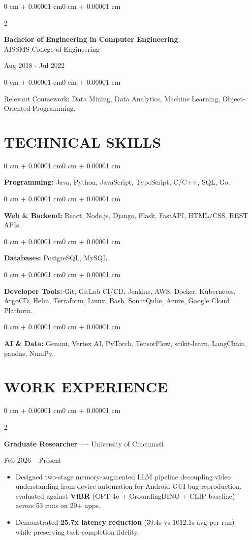 \documentclass[10pt, letterpaper]{article}
\newenvironment{highlights}{
    \begin{itemize}[
        topsep=0.10 cm,
        parsep=0.06 cm,
        partopsep=0pt,
        itemsep=0.06 cm,
        leftmargin=12pt
    ]
}{
    \end{itemize}
}
\newenvironment{onecolentry}{
    \begin{adjustwidth}{0 cm + 0.00001 cm}{0 cm + 0.00001 cm}
}{
    \end{adjustwidth}
}
\newenvironment{twocolentry}[2][]{
    \onecolentry
    \def\secondColumn{#2}
    \setcolumnwidth{\fill, 4.5 cm}
    \begin{paracol}{2}
}{
    \switchcolumn \raggedleft \secondColumn
    \end{paracol}
    \endonecolentry
}
\begin{document}
\begin{twocolentry}{
    Aug 2018 - Jul 2022
}
    \textbf{Bachelor of Engineering in Computer Engineering} \\
    AISSMS College of Engineering
\end{twocolentry}
\begin{onecolentry}
Relevant Coursework: Data Mining, Data Analytics, Machine Learning, Object-Oriented Programming.
\end{onecolentry}
\section{TECHNICAL SKILLS}
\begin{onecolentry}
\textbf{Programming:} Java, Python, JavaScript, TypeScript, C/C++, SQL, Go.
\end{onecolentry}
\vspace{0.06 cm}
\begin{onecolentry}
\textbf{Web \& Backend:} React, Node.js, Django, Flask, FastAPI, HTML/CSS, REST APIs.
\end{onecolentry}
\vspace{0.06 cm}
\begin{onecolentry}
\textbf{Databases:} PostgreSQL, MySQL.
\end{onecolentry}
\vspace{0.06 cm}
\begin{onecolentry}
\textbf{Developer Tools:} Git, GitLab CI/CD, Jenkins, AWS, Docker, Kubernetes, ArgoCD, Helm, Terraform, Linux, Bash, SonarQube, Azure, Google Cloud Platform.
\end{onecolentry}
\vspace{0.06 cm}
\begin{onecolentry}
\textbf{AI \& Data:} Gemini, Vertex AI, PyTorch, TensorFlow, scikit-learn, LangChain, pandas, NumPy.
\end{onecolentry}

\section{WORK EXPERIENCE}
\begin{twocolentry}{Feb 2026 -- Present}
\textbf{Graduate Researcher} ---- University of Cincinnati
\end{twocolentry}
\begin{highlights}
  \item Designed two-stage memory-augmented LLM pipeline decoupling video understanding from device automation for Android GUI bug reproduction, evaluated against \textbf{ViBR} (GPT-4o + GroundingDINO + CLIP baseline) across 53 runs on 20+ apps.
  \item Demonstrated \textbf{25.7x latency reduction} (39.4s vs 1012.1s avg per run) while preserving task-completion fidelity.
\end{highlights}
\end{document}
